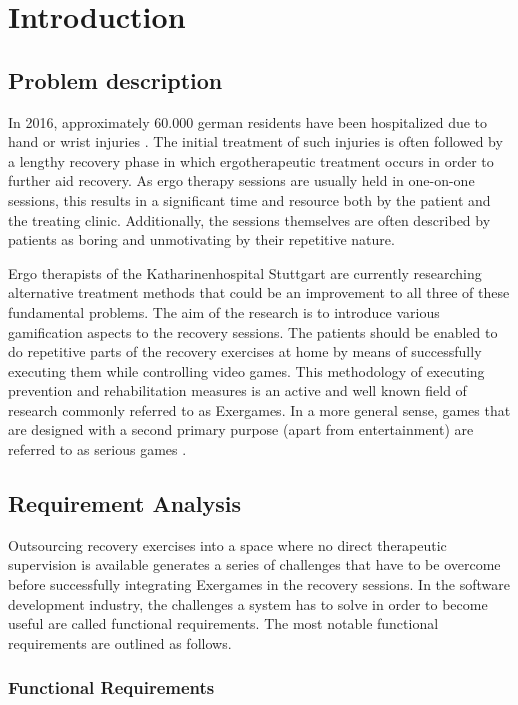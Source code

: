 \chapter{Introduction}
\section{Problem description}
In 2016, approximately 60.000 german residents have been hospitalized due to hand or wrist injuries \cite{DeStatisHandInjuries}. The initial treatment of such injuries is often followed by a lengthy recovery phase in which ergotherapeutic treatment occurs in order to further aid recovery. As ergo therapy sessions are usually held in one-on-one sessions, this results in a significant time and resource both by the patient and the treating clinic. Additionally, the sessions themselves are often described by patients as boring and unmotivating by their repetitive nature.

Ergo therapists of the Katharinenhospital Stuttgart are currently researching alternative treatment methods that could be an improvement to all three of these fundamental problems. The aim of the research is to introduce various gamification aspects to the recovery sessions. The patients should be enabled to do repetitive parts of the recovery exercises at home by means of successfully executing them while controlling video games. This methodology of executing prevention and rehabilitation measures is an active and well known field of research commonly referred to as Exergames\cite{RehaCareExergames}. In a more general sense, games that are designed with a second primary purpose (apart from entertainment) are referred to as serious games \cite{SeriousGamesBook}. 

\section{Requirement Analysis}
Outsourcing recovery exercises into a space where no direct therapeutic supervision is available generates a series of challenges that have to be overcome before successfully integrating Exergames in the recovery sessions. In the software development industry, the challenges a system has to solve in order to become useful are called functional requirements.  The most notable functional requirements are outlined as follows.

\subsection{Functional Requirements}

